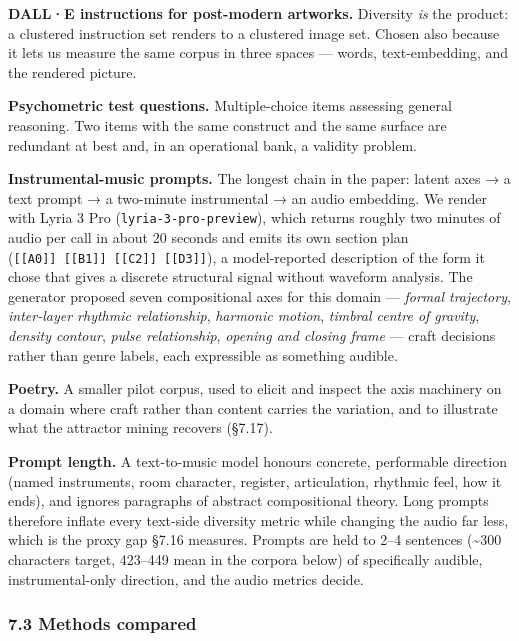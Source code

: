 \documentclass[
  10pt,
]{article}
\theoremstyle{plain}
\theoremstyle{definition}
\begin{document}
\textbf{DALL·E instructions for post-modern artworks.} Diversity
\emph{is} the product: a clustered instruction set renders to a
clustered image set. Chosen also because it lets us measure the same
corpus in three spaces --- words, text-embedding, and the rendered
picture.

\textbf{Psychometric test questions.} Multiple-choice items assessing
general reasoning. Two items with the same construct and the same
surface are redundant at best and, in an operational bank, a validity
problem.

\textbf{Instrumental-music prompts.} The longest chain in the paper:
latent axes → a text prompt → a two-minute instrumental → an audio
embedding. We render with Lyria 3 Pro (\texttt{lyria-3-pro-preview}),
which returns roughly two minutes of audio per call in about 20 seconds
and emits its own section plan
(\texttt{{[}{[}A0{]}{]}\ {[}{[}B1{]}{]}\ {[}{[}C2{]}{]}\ {[}{[}D3{]}{]}}),
a model-reported description of the form it chose that gives a discrete
structural signal without waveform analysis. The generator proposed
seven compositional axes for this domain --- \emph{formal trajectory},
\emph{inter-layer rhythmic relationship}, \emph{harmonic motion},
\emph{timbral centre of gravity}, \emph{density contour}, \emph{pulse
relationship}, \emph{opening and closing frame} --- craft decisions
rather than genre labels, each expressible as something audible.

\textbf{Poetry.} A smaller pilot corpus, used to elicit and inspect the
axis machinery on a domain where craft rather than content carries the
variation, and to illustrate what the attractor mining recovers (§7.17).

\textbf{Prompt length.} A text-to-music model honours concrete,
performable direction (named instruments, room character, register,
articulation, rhythmic feel, how it ends), and ignores paragraphs of
abstract compositional theory. Long prompts therefore inflate every
text-side diversity metric while changing the audio far less, which is
the proxy gap §7.16 measures. Prompts are held to 2--4 sentences
(\textasciitilde300 characters target, 423--449 mean in the corpora
below) of specifically audible, instrumental-only direction, and the
audio metrics decide.

\subsubsection{7.3 Methods compared}\label{73-methods-compared}
\end{document}
